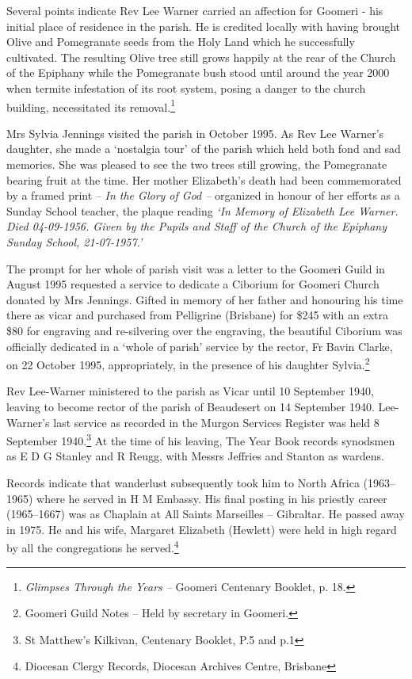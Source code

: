 Several points indicate Rev Lee Warner carried an affection for Goomeri - his initial place of residence in the parish. He is credited locally with having brought Olive and Pomegranate seeds from the Holy Land which he successfully cultivated. The resulting Olive tree still grows happily at the rear of the Church of the Epiphany while the Pomegranate bush stood until around the year 2000 when termite infestation of its root system, posing a danger to the church building, necessitated its removal.\footnote{\emph{Glimpses Through the Years --} Goomeri Centenary Booklet, p. 18.}

Mrs Sylvia Jennings visited the parish in October 1995. As Rev Lee Warner's daughter, she made a `nostalgia tour' of the parish which held both fond and sad memories. She was pleased to see the two trees still growing, the Pomegranate bearing fruit at the time. Her mother Elizabeth's death had been commemorated by a framed print -- \emph{In the Glory of God --} organized in honour of her efforts as a Sunday School teacher, the plaque reading \emph{`In Memory of Elizabeth Lee Warner. Died 04-09-1956. Given by the Pupils and Staff of the Church of the Epiphany Sunday School, 21-07-1957.'}

The prompt for her whole of parish visit was a letter to the Goomeri Guild in August 1995 requested a service to dedicate a Ciborium for Goomeri Church donated by Mrs Jennings. Gifted in memory of her father and honouring his time there as vicar and purchased from Pelligrine (Brisbane) for \$245 with an extra \$80 for engraving and re-silvering over the engraving, the beautiful Ciborium was officially dedicated in a `whole of parish' service by the rector, Fr Bavin Clarke, on 22 October 1995, appropriately, in the presence of his daughter Sylvia.\footnote{Goomeri Guild Notes -- Held by secretary in Goomeri.}

Rev Lee-Warner ministered to the parish as Vicar until 10 September 1940, leaving to become rector of the parish of Beaudesert on 14 September 1940. Lee-Warner's last service as recorded in the Murgon Services Register was held 8 September 1940.\footnote{St Matthew's Kilkivan, Centenary Booklet, P.5 and p.1} At the time of his leaving, The Year Book records synodsmen as E D G Stanley and R Reugg, with Messrs Jeffries and Stanton as wardens.

Records indicate that wanderlust subsequently took him to North Africa (1963--1965) where he served in H M Embassy. His final posting in his priestly career (1965--1667) was as Chaplain at All Saints Marseilles -- Gibraltar. He passed away in 1975. He and his wife, Margaret Elizabeth (Hewlett) were held in high regard by all the congregations he served.\footnote{Diocesan Clergy Records, Diocesan Archives Centre, Brisbane}

